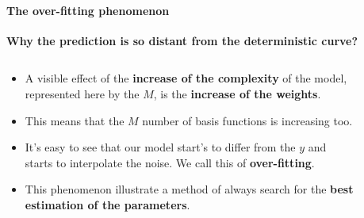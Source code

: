 \begin{frame}{\insertsubsection}
	\framesubtitle{The over-fitting phenomenon}
	\textcolor{UniGold}{\textbf{Why the prediction is so distant from the deterministic curve?}}
	\begin{columns}
		\begin{column}{0.475\textwidth}
			\begin{itemize}	
			\item A visible effect of the \textcolor{UniOrange}{\textbf{increase of the complexity}} of the model, represented here by the $M$, is the \textcolor{UniOrange}{\textbf{increase of the weights}}.
			\item This means that the $M$ number of basis functions is increasing too.
			\item It's easy to see that our model start's to differ from the $y$ and starts to interpolate the noise. We call this of \textcolor{UniOrange}{\textbf{over-fitting}}.
			\item This phenomenon illustrate a method of always search for the \textcolor{UniOrange}{\textbf{best estimation of the parameters}}.
			
			\vspace{1em}
			
			\end{itemize}
		\end{column}
		\begin{column}{0.475\textwidth}  %
			\begin{figure}
				\setlength{}
				
			\end{figure}
		\end{column}
	\end{columns}
\end{frame}

